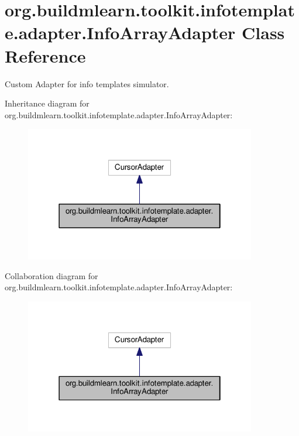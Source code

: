 \hypertarget{classorg_1_1buildmlearn_1_1toolkit_1_1infotemplate_1_1adapter_1_1InfoArrayAdapter}{}\section{org.\+buildmlearn.\+toolkit.\+infotemplate.\+adapter.\+Info\+Array\+Adapter Class Reference}
\label{classorg_1_1buildmlearn_1_1toolkit_1_1infotemplate_1_1adapter_1_1InfoArrayAdapter}


Custom Adapter for info template\textquotesingle{}s simulator.  




Inheritance diagram for org.\+buildmlearn.\+toolkit.\+infotemplate.\+adapter.\+Info\+Array\+Adapter\+:
\nopagebreak
\begin{figure}[H]
\begin{center}
\leavevmode
\includegraphics[width=286pt]{classorg_1_1buildmlearn_1_1toolkit_1_1infotemplate_1_1adapter_1_1InfoArrayAdapter__inherit__graph}
\end{center}
\end{figure}


Collaboration diagram for org.\+buildmlearn.\+toolkit.\+infotemplate.\+adapter.\+Info\+Array\+Adapter\+:
\nopagebreak
\begin{figure}[H]
\begin{center}
\leavevmode
\includegraphics[width=286pt]{classorg_1_1buildmlearn_1_1toolkit_1_1infotemplate_1_1adapter_1_1InfoArrayAdapter__coll__graph}
\end{center}
\end{figure}

